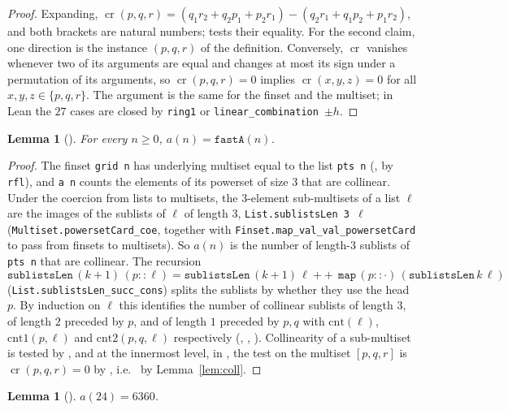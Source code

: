 \documentclass[11pt]{amsart}
\theoremstyle{plain}
\newtheorem{lemma}[theorem]{Lemma}
\theoremstyle{definition}
\newcommand{\cross}{\operatorname{cr}}
\begin{document}
\begin{proof}
Expanding,
$\cross(p,q,r)=(q_1r_2+q_2p_1+p_2r_1)-(q_2r_1+q_1p_2+p_1r_2)$,
and both brackets are natural numbers;  tests their equality. For the second claim, one direction is the instance $(p,q,r)$ of the definition. Conversely, $\cross$ vanishes whenever two of its arguments are equal and changes at most its sign under a permutation of its arguments, so $\cross(p,q,r)=0$ implies $\cross(x,y,z)=0$ for all $x,y,z\in\{p,q,r\}$. The argument is the same for the finset and the multiset; in Lean the $27$ cases are closed by \texttt{ring1} or \texttt{linear\_combination}~$\pm h$.
\end{proof}

\begin{lemma}[]\label{lem:fast}
For every $n\ge0$, $a(n)=\mathtt{fastA}(n)$.
\end{lemma}

\begin{proof}
The finset \texttt{grid n} has underlying multiset equal to the list \texttt{pts n} (, by \texttt{rfl}), and \texttt{a n} counts the elements of its powerset of size $3$ that are collinear. Under the coercion from lists to multisets, the $3$-element sub-multisets of a list $\ell$ are the images of the sublists of $\ell$ of length $3$, \texttt{List.sublistsLen 3 $\ell$} (\texttt{Multiset.powersetCard\_coe}, together with \texttt{Finset.map\_val\_val\_powersetCard} to pass from finsets to multisets). So $a(n)$ is the number of length-$3$ sublists of \texttt{pts n} that are collinear. The recursion
\[
  \mathtt{sublistsLen}\,(k+1)\,(p::\ell)=\mathtt{sublistsLen}\,(k+1)\,\ell\ \mathbin{+\!\!+}\ \mathtt{map}\,(p::\cdot)\,(\mathtt{sublistsLen}\,k\,\ell)
\]
(\texttt{List.sublistsLen\_succ\_cons}) splits the sublists by whether they use the head $p$. By induction on $\ell$ this identifies the number of collinear sublists of length $3$, of length $2$ preceded by $p$, and of length $1$ preceded by $p,q$ with $\mathrm{cnt}(\ell)$, $\mathrm{cnt1}(p,\ell)$ and $\mathrm{cnt2}(p,q,\ell)$ respectively (, , ). Collinearity of a sub-multiset is tested by , and at the innermost level, in , the test on the multiset $[p,q,r]$ is $\cross(p,q,r)=0$ by , i.e.\  by Lemma~\ref{lem:coll}.
\end{proof}

\begin{lemma}[]\label{lem:a24}
$a(24)=6360$.
\end{lemma}
\end{document}
